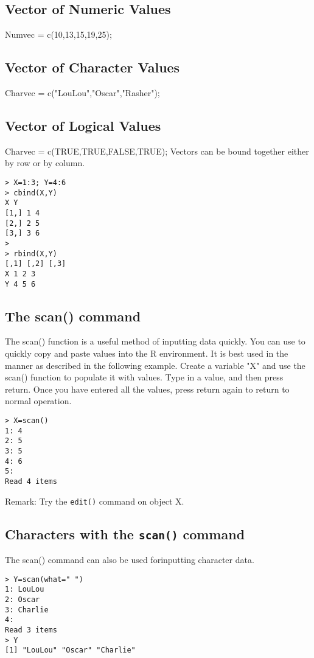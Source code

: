 \subsection*{ Vector of Numeric Values}
Numvec = c(10,13,15,19,25);

\subsection*{ Vector of Character Values}
Charvec = c("LouLou","Oscar","Rasher");


\subsection*{Vector of Logical Values}
Charvec = c(TRUE,TRUE,FALSE,TRUE);
Vectors can be bound together either by row or by column.
\begin{verbatim}
> X=1:3; Y=4:6
> cbind(X,Y)
X Y
[1,] 1 4
[2,] 2 5
[3,] 3 6
>
> rbind(X,Y)
[,1] [,2] [,3]
X 1 2 3
Y 4 5 6
\end{verbatim}
\subsection{The scan() command}
The scan() function is a useful method of inputting data quickly. You can use to quickly copy
and paste values into the R environment. It is best used in the manner as described in the
following example. Create a variable "X" and use the scan() function to populate it with
values. Type in a value, and then press return. Once you have entered all the values, press
return again to return to normal operation.
\begin{framed}
\begin{verbatim}
> X=scan()
1: 4
2: 5
3: 5
4: 6
5:
Read 4 items
\end{verbatim}
\end{framed}

Remark: Try the \texttt{edit()} command on object X.
\subsection*{Characters with the \texttt{scan()} command}
The scan() command can also be used forinputting character data.
\begin{verbatim}
> Y=scan(what=" ")
1: LouLou
2: Oscar
3: Charlie
4:
Read 3 items
> Y
[1] "LouLou" "Oscar" "Charlie"
\end{verbatim}
